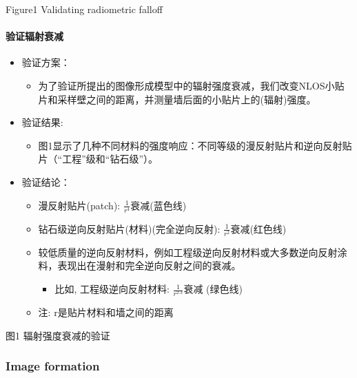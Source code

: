 \documentclass[11pt]{article}
\providecommand{\tightlist}{%
      \setlength{\itemsep}{0pt}\setlength{\parskip}{0pt}}
\begin{document}
 Figure1 Validating radiometric falloff

    \paragraph{验证辐射衰减}\label{ux9a8cux8bc1ux8f90ux5c04ux8870ux51cf}

\begin{itemize}
\tightlist
\item
  验证方案：

  \begin{itemize}
  \tightlist
  \item
    为了验证所提出的图像形成模型中的辐射强度衰减，我们改变NLOS小贴片和采样壁之间的距离，并测量墙后面的小贴片上的(辐射)强度。
  \end{itemize}
\item
  验证结果:

  \begin{itemize}
  \tightlist
  \item
    图1显示了几种不同材料的强度响应：不同等级的漫反射贴片和逆向反射贴片（``工程''级和``钻石级''）。
  \end{itemize}
\item
  验证结论：

  \begin{itemize}
  \tightlist
  \item
    漫反射贴片(patch): \(\frac{1}{r^{4}}\)衰减(蓝色线)
  \item
    钻石级逆向反射贴片(材料)(完全逆向反射):
    \(\frac{1}{r^{2}}\)衰减(红色线)
  \item
    较低质量的逆向反射材料，例如工程级逆向反射材料或大多数逆向反射涂料，表现出在漫射和完全逆向反射之间的衰减。

    \begin{itemize}
    \tightlist
    \item
      比如, 工程级逆向反射材料: \(\frac{1}{r^{2.3}}\)衰减 (绿色线)
    \end{itemize}
  \item
    注: r是贴片材料和墙之间的距离
  \end{itemize}
\end{itemize}

 图1 辐射强度衰减的验证

    \subsubsection{Image formation}\label{image-formation}
\end{document}
